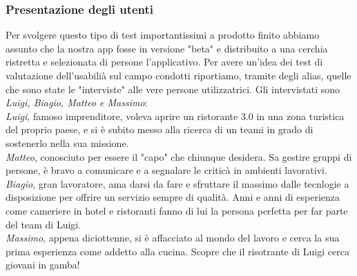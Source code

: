     \subsubsection{Presentazione degli utenti}
        \begin{flushleft}
            Per svolgere questo tipo di test importantissimi a prodotto finito abbiamo assunto che la nostra app fosse in versione "beta" e
            distribuito a una cerchia ristretta e selezionata di persone l'applicativo.
            Per avere un'idea dei test di valutazione dell'usabilià sul campo condotti riportiamo, tramite degli alias, quelle che sono state le
            "interviste" alle vere persone utilizzatrici.
            Gli intervistati sono \emph{Luigi, Biagio, Matteo e Massimo}:
            \\\emph{Luigi}, famoso imprenditore, voleva aprire un ristorante 3.0 in una zona turistica del proprio paese, e si è subito messo alla ricerca di un teami
            in grado di sostenerlo nella sua missione. 
            \\\emph{Matteo}, conosciuto per essere il "capo" che chiunque desidera. Sa gestire gruppi di persone, è bravo a comunicare e a segnalare le criticà in ambienti lavorativi.
            \\\emph{Biagio}, gran lavoratore, ama darsi da fare e sfruttare il massimo dalle tecnlogie a disposizione per offrire un servizio sempre di qualità.
            Anni e anni di esperienza come cameriere in hotel e ristoranti fanno di lui la persona perfetta per far parte del team di Luigi.
            \\\emph{Massimo}, appena diciottenne, si è affacciato al mondo del lavoro e cerca la sua prima esperienza come addetto alla cucina. Scopre che il risotrante di Luigi cerca giovani in gamba!
        
        \end{flushleft}

